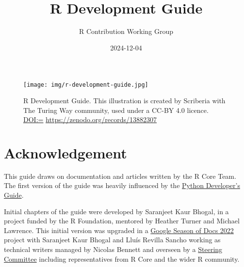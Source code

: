 \documentclass[
]{book}
\title{R Development Guide}
\author{R Contribution Working Group}
\date{2024-12-04}
\let\oldmaketitle\maketitle
\begin{document}
\maketitle


\newpage

\let\maketitle\oldmaketitle
\maketitle

{
\setcounter{tocdepth}{1}
\tableofcontents
}
\chapter*{}\label{section}

\begin{figure}
\centering
\texttt{[image: img/r-development-guide.jpg]}
\caption{R Development Guide. This illustration is created by Scriberia with The Turing Way community, used under a CC-BY 4.0 licence. \url{DOI:=} \url{https://zenodo.org/records/13882307}}
\end{figure}

\chapter*{Acknowledgement}\label{acknowledgement}

This guide draws on documentation and articles written by the R Core Team. The first version of the guide was heavily influenced by the \href{https://devguide.python.org/}{Python Developer's Guide}.

Initial chapters of the guide were developed by Saranjeet Kaur Bhogal, in a project funded by the R Foundation, mentored by Heather Turner and Michael Lawrence. This initial version was upgraded in a \href{https://github.com/rstats-gsod/gsod2022/wiki/GSOD-2022-Proposal}{Google Season of Docs 2022} project with Saranjeet Kaur Bhogal and Lluís Revilla Sancho working as technical writers managed by Nicolas Bennett and overseen by a \href{https://github.com/rstats-gsod/gsod2022/wiki/GSOD-2022-Proposal\#steering-committee}{Steering Committee} including representatives from R Core and the wider R community.
\end{document}
